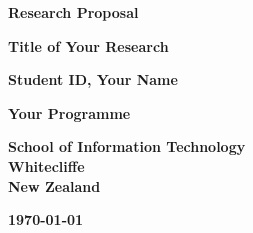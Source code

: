 \documentclass[a4paper,man,12pt]{article}
\begin{document}

\begin{titlepage}
    \begin{center} %
        
        \vspace*{2cm}
        
        \textbf{\LARGE Research Proposal}
        
        \vspace{1.5cm}
        
        \textbf{\Large Title of Your Research}
        
        \vspace{2cm}
        
        \textbf{Student ID, Your Name}
        
        \vfill
        
        \textbf{Your Programme}
        
        \vfill
        
        \textbf{School of Information Technology}\\
        \textbf{Whitecliffe}\\
        \textbf{New Zealand}
        
        \vspace{1cm}
        
        \textbf{\today}
        
    \end{center} %
\end{titlepage} %
\end{document}
